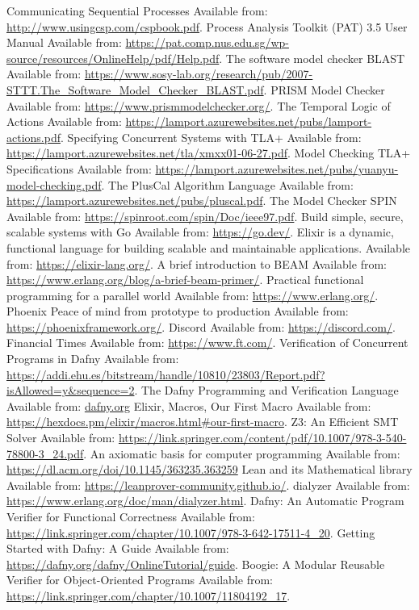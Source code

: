 \begin{thebibliography}{9}
Communicating Sequential Processes
Available from: \url{http://www.usingcsp.com/cspbook.pdf}.
Process Analysis Toolkit (PAT) 3.5 User
Manual
Available from: \url{https://pat.comp.nus.edu.sg/wp-source/resources/OnlineHelp/pdf/Help.pdf}.
The software model checker BLAST
Available from: \url{https://www.sosy-lab.org/research/pub/2007-STTT.The_Software_Model_Checker_BLAST.pdf}.
PRISM Model Checker
Available from: \url{https://www.prismmodelchecker.org/}.
The Temporal Logic of Actions
Available from: \url{https://lamport.azurewebsites.net/pubs/lamport-actions.pdf}.
Specifying Concurrent Systems with TLA+
Available from: \url{https://lamport.azurewebsites.net/tla/xmxx01-06-27.pdf}.
Model Checking TLA+ Specifications
Available from: \url{https://lamport.azurewebsites.net/pubs/yuanyu-model-checking.pdf}.
The PlusCal Algorithm Language
Available from: \url{https://lamport.azurewebsites.net/pubs/pluscal.pdf}.
The Model Checker SPIN
Available from: \url{https://spinroot.com/spin/Doc/ieee97.pdf}.
Build simple, secure, scalable systems with Go
Available from: \url{https://go.dev/}.
Elixir is a dynamic, functional language for building scalable and maintainable applications.
Available from: \url{https://elixir-lang.org/}.
A brief introduction to BEAM
Available from: \url{https://www.erlang.org/blog/a-brief-beam-primer/}.
Practical functional programming for a parallel world
Available from: \url{https://www.erlang.org/}.
Phoenix Peace of mind from prototype to production
Available from: \url{https://phoenixframework.org/}.
Discord
Available from: \url{https://discord.com/}.
Financial Times
Available from: \url{https://www.ft.com/}.
Verification of Concurrent Programs in Dafny
Available from: \url{https://addi.ehu.es/bitstream/handle/10810/23803/Report.pdf?isAllowed=y&sequence=2}.
The Dafny Programming and Verification Language
Available from: \url{dafny.org}
Elixir, Macros, Our First Macro
Available from: \url{https://hexdocs.pm/elixir/macros.html#our-first-macro}.
Z3: An Efficient SMT Solver
Available from: \url{https://link.springer.com/content/pdf/10.1007/978-3-540-78800-3_24.pdf}.
An axiomatic basis for computer programming
Available from: \url{https://dl.acm.org/doi/10.1145/363235.363259}
Lean and its Mathematical library
Available from: \url{https://leanprover-community.github.io/}.
dialyzer
Available from: \url{https://www.erlang.org/doc/man/dialyzer.html}.
Dafny: An Automatic Program Verifier for Functional Correctness
Available from: \url{https://link.springer.com/chapter/10.1007/978-3-642-17511-4_20}.
Getting Started with Dafny: A Guide
Available from: \url{https://dafny.org/dafny/OnlineTutorial/guide}.
Boogie: A Modular Reusable Verifier for Object-Oriented Programs
Available from: \url{https://link.springer.com/chapter/10.1007/11804192_17}.
\end{thebibliography}